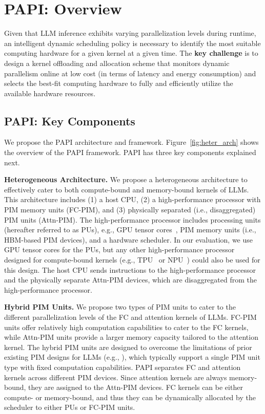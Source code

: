\section{PAPI: Overview}

Given that LLM inference exhibits varying parallelization levels during runtime, an intelligent dynamic scheduling policy is necessary to identify the most suitable computing hardware for a given kernel at a given time. 
The \textbf{key challenge} is to design a kernel offloading and allocation scheme that monitors dynamic parallelism online at low cost (in terms of latency and energy consumption) and selects the best-fit computing hardware to fully and efficiently utilize the available hardware resources.




\subsection{PAPI: Key Components}
We propose the PAPI architecture and framework. Figure~\ref{fig:heter_arch} shows the overview of the PAPI framework. PAPI has three key components explained next.



\noindent\textbf{Heterogeneous Architecture.}
We propose a heterogeneous architecture to effectively cater to both compute-bound and memory-bound kernels of LLMs. This architecture includes (1) a host CPU, (2) a high-performance processor with PIM memory units (FC-PIM), and (3) physically separated (i.e., disaggregated) PIM units (Attn-PIM). The high-performance processor includes processing units (hereafter referred to as PUs), e.g., GPU tensor cores~\cite{tensorcore}, PIM memory units (i.e., HBM-based PIM devices), and a hardware scheduler. In our evaluation, we use GPU tensor cores for the PUs, but any other high-performance processor designed for compute-bound kernels (e.g., TPU~\cite{jouppi2017datacenter} or NPU~\cite{chen2014diannao}) could also be used for this design. The host CPU sends instructions to the high-performance processor and the physically separate Attn-PIM devices, which are disaggregated from the high-performance processor.

\noindent\textbf{Hybrid PIM Units.}
We propose two types of PIM units to cater to the different parallelization levels of the FC and attention kernels of LLMs.
FC-PIM units offer relatively high computation capabilities to cater to the FC kernels, while Attn-PIM units provide a larger memory capacity tailored to the attention kernel.
The hybrid PIM units are designed to overcome the limitations of prior existing PIM designs for LLMs (e.g., \cite{lee2021hardware, kwon2022system, park2024attacc}), which typically support a single PIM unit type with fixed computation capabilities.
PAPI separates FC and attention kernels across different PIM devices. 
Since attention kernels are always memory-bound, they are assigned to the Attn-PIM devices.
FC kernels can be either compute- or memory-bound, and thus they can be dynamically allocated by the scheduler to either PUs or FC-PIM units.

